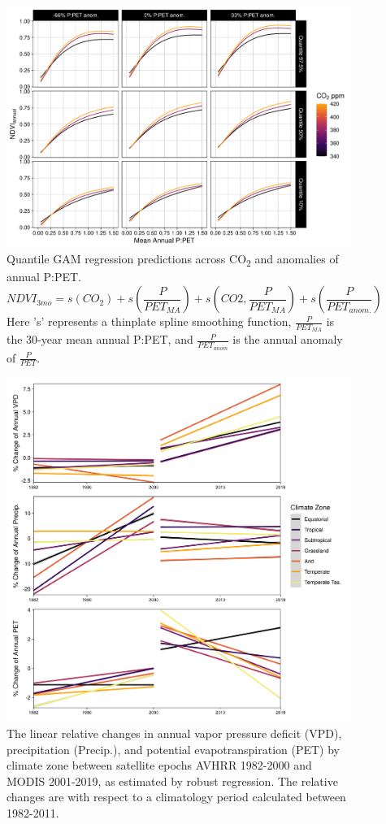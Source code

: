 \documentclass[gc, manuscript]{copernicus}
\begin{document}
\clearpage
\begin{figure}
\includegraphics[width=14cm]{../../figures/appendix-A/SM_Fig7_quantile_reg_ndvi_ppet_x_co2} \caption{Quantile GAM regression predictions across CO\textsubscript{2} and anomalies of annual P:PET. $$NDVI_{3mo} = s(CO_{2})+s(\frac{P}{PET_{MA}})+s(CO2,\frac{P}{PET_{MA}})+s(\frac{P}{PET_{anom.}})$$ Here 's' represents a thinplate spline smoothing function, $\frac{P}{PET_{MA}}$ is the 30-year mean annual P:PET, and $\frac{P}{PET_{anom}}$ is the annual anomaly of $\frac{P}{PET}$.}\label{fig:FigA7}
\end{figure}
\clearpage

\clearpage
\begin{figure}
\includegraphics[width=14cm]{../../figures/appendix-A/SM_Fig8_zonal_vpd_precip_pet_trend_by_epoch} \caption{The linear relative changes in annual vapor pressure deficit (VPD), precipitation (Precip.), and potential evapotranspiration (PET) by climate zone between satellite epochs AVHRR 1982-2000 and MODIS 2001-2019, as estimated by robust regression. The relative changes are with respect to a climatology period calculated between 1982-2011.}\label{fig:FigA8}
\end{figure}
\clearpage
\end{document}

